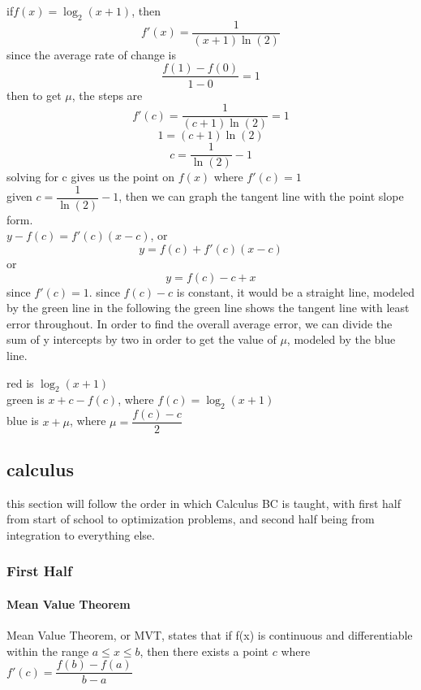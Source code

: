 \documentclass{article} %
\begin{document}
        \begin{center}
            if$f(x)=\log_2(x+1)$, then $$f'(x)=\dfrac{1}{(x+1)\ln(2)}$$since the average rate of change is $$\dfrac{f(1)-f(0)}{1-0}=1$$
            then to get $\mu$, the steps are $$f'(c)=\dfrac{1}{(c+1)\ln(2)}=1$$ $$1=(c+1)\ln(2)$$ $$c=\dfrac{1}{\ln(2)}-1$$
            solving for c gives us the point on $f(x)$ where $f'(c)=1$
            \\given $c=\dfrac{1}{\ln(2)}-1$, then we can graph the tangent line with the point slope form.\\ $y-f(c)=f'(c)(x-c)$, or
            $$y=f(c)+f'(c)(x-c)$$ or $$y=f(c)-c+x$$ since $f'(c)=1$. since $f(c)-c$ is constant, it would be a straight line, modeled by the green line in the following
            the green line shows the tangent line with least error throughout. In order to find the overall average error, we can divide the sum of y intercepts by two in order to get the value of $\mu$, modeled by the blue line.
            red is $\log_2(x+1)$\\
            green is $x+c-f(c)$, where $f(c)=\log_2(x+1)$\\
            blue is $x+\mu$, where $\mu=\dfrac{f(c)-c}{2}$
        \end{center}
    \subsection{calculus}
    this section will follow the order in which Calculus BC is taught, with first half from start of school to optimization problems, and second half being from integration to everything else.
        \subsubsection{First Half}
            \paragraph{Mean Value Theorem} %
            \label{ssub:Mean Value Theorem}
                    Mean Value Theorem, or MVT, states that if f(x) is continuous and differentiable within the range $a\le x \le b$, then there exists a point $c$ where $f'(c) = \dfrac{f(b)-f(a)}{b-a}$
\end{document}
